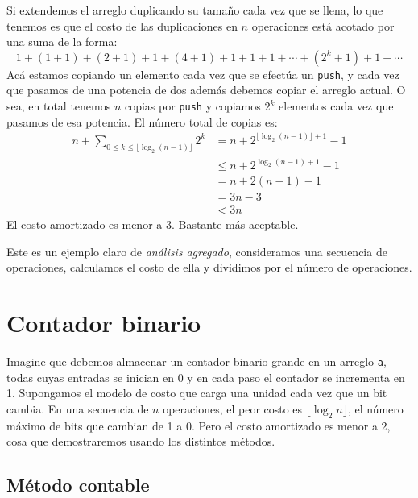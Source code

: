   Si extendemos el arreglo duplicando su tamaño cada vez que se llena,
  lo que tenemos es que el costo de las duplicaciones en \(n\) operaciones
  está acotado por una suma de la forma:
  \begin{equation*}
    1 + (1 + 1) + (2 + 1) + 1 + (4 + 1) + 1 + 1 + 1
      + \dotsb
      + (2^k + 1) + 1
      + \dotsb
  \end{equation*}
  Acá estamos copiando un elemento
  cada vez que se efectúa un \lstinline!push!,
  y cada vez que pasamos de una potencia de dos
  además debemos copiar el arreglo actual.
  O sea,
  en total tenemos \(n\) copias por \lstinline!push!
  y copiamos \(2^k\) elementos cada vez que pasamos de esa potencia.
  El número total de copias es:
  \begin{align*}
    n + \sum_{0 \le k \le \lfloor \log_2 (n - 1) \rfloor} 2^k
      &=   n + 2^{\lfloor \log_2 (n - 1) \rfloor + 1} - 1 \\
      &\le n + 2^{\log_2 (n - 1) + 1} - 1 \\
      &=   n + 2 (n - 1) - 1 \\
      &=   3 n - 3 \\
      &<   3 n
  \end{align*}
  El costo amortizado es menor a \num{3}.
  Bastante más aceptable.

  Este es un ejemplo claro de \emph{análisis agregado},
  consideramos una secuencia de operaciones,
  calculamos el costo de ella y dividimos por el número de operaciones.

\section{Contador binario}
\label{sec:contador-binario}

  Imagine que debemos almacenar un contador binario grande
  en un arreglo \lstinline!a!,
  todas cuyas entradas se inician en \num{0}
  y en cada paso el contador se incrementa en \num{1}.
  Supongamos el modelo de costo
  que carga una unidad cada vez que un bit cambia.
  En una secuencia de \(n\) operaciones,
  el peor costo es \(\lfloor \log_2 n \rfloor\),
  el número máximo de bits que cambian de \num{1} a \num{0}.
  Pero el costo amortizado es menor a \num{2},
  cosa que demostraremos usando los distintos métodos.

\subsection{Método contable}
\label{sec:metodo-contable}


